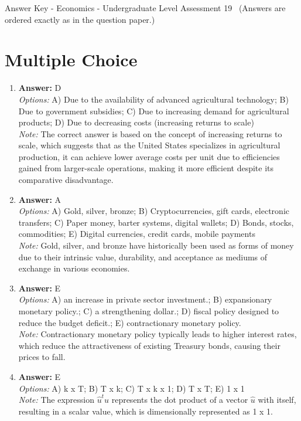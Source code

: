 \documentclass[12pt]{article}
\begin{document}
\begin{center}
Answer Key - Economics - Undergraduate Level Assessment 19 \
\small (Answers are ordered exactly as in the question paper.)
\end{center}

\section*{Multiple Choice}
\begin{enumerate}[label=\arabic*.]
\item \textbf{Answer:} D
\\ \textit{Options:} A) Due to the availability of advanced agricultural technology; B) Due to government subsidies; C) Due to increasing demand for agricultural products; D) Due to decreasing costs (increasing returns to scale)
\\ \textit{Note:} The correct answer is based on the concept of increasing returns to scale, which suggests that as the United States specializes in agricultural production, it can achieve lower average costs per unit due to efficiencies gained from larger-scale operations, making it more efficient despite its comparative disadvantage.
\item \textbf{Answer:} A
\\ \textit{Options:} A) Gold, silver, bronze; B) Cryptocurrencies, gift cards, electronic transfers; C) Paper money, barter systems, digital wallets; D) Bonds, stocks, commodities; E) Digital currencies, credit cards, mobile payments
\\ \textit{Note:} Gold, silver, and bronze have historically been used as forms of money due to their intrinsic value, durability, and acceptance as mediums of exchange in various economies.
\item \textbf{Answer:} E
\\ \textit{Options:} A) an increase in private sector investment.; B) expansionary monetary policy.; C) a strengthening dollar.; D) fiscal policy designed to reduce the budget deficit.; E) contractionary monetary policy.
\\ \textit{Note:} Contractionary monetary policy typically leads to higher interest rates, which reduce the attractiveness of existing Treasury bonds, causing their prices to fall.
\item \textbf{Answer:} E
\\ \textit{Options:} A) k x T; B) T x k; C) T x k x 1; D) T x T; E) 1 x 1
\\ \textit{Note:} The expression $\hat{u}^t \hat{u}$ represents the dot product of a vector $\hat{u}$ with itself, resulting in a scalar value, which is dimensionally represented as 1 x 1.

\end{enumerate}
\end{document}
